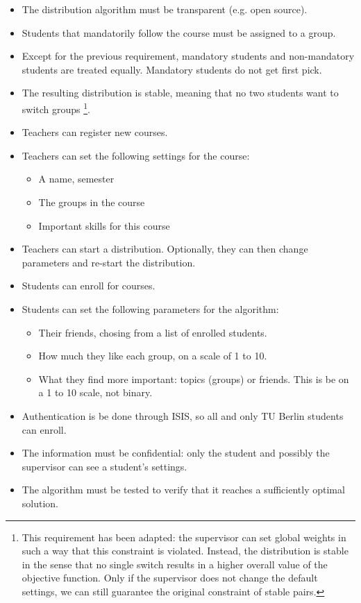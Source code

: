 \begin{itemize}
	\item The distribution algorithm must be transparent (e.g. open source).
	\item Students that mandatorily follow the course must be assigned to a group.
	\item Except for the previous requirement, mandatory students and non-mandatory students are treated equally. Mandatory students do not get first pick.
	\item The resulting distribution is stable, meaning that no two students want to switch groups
	\footnote{This requirement has been adapted: the supervisor can set global weights in such a way that this constraint is violated. Instead, the distribution is stable in the sense that no single switch results in a higher overall value of the objective function. Only if the supervisor does not change the default settings, we can still guarantee the original constraint of stable pairs.}.
	
	\item Teachers can register new courses.
	\item Teachers can set the following settings for the course:
		\begin{itemize}
			\item A name, semester
			\item The groups in the course
			\item Important skills for this course
		\end{itemize}
	\item Teachers can start a distribution. Optionally, they can then change parameters and re-start the distribution.
	
	\item Students can enroll for courses.
	\item Students can set the following parameters for the algorithm:
		\begin{itemize}
			\item Their friends, chosing from a list of enrolled students.
			\item How much they like each group, on a scale of 1 to 10.
			\item What they find more important: topics (groups) or friends. This is be on a 1 to 10 scale, not binary.
		\end{itemize}

	\item Authentication is be done through ISIS, so all and only TU Berlin students can enroll.
	\item The information must be confidential: only the student and possibly the supervisor can see a student's settings.
	\item The algorithm must be tested to verify that it reaches a sufficiently optimal solution.
\end{itemize}

